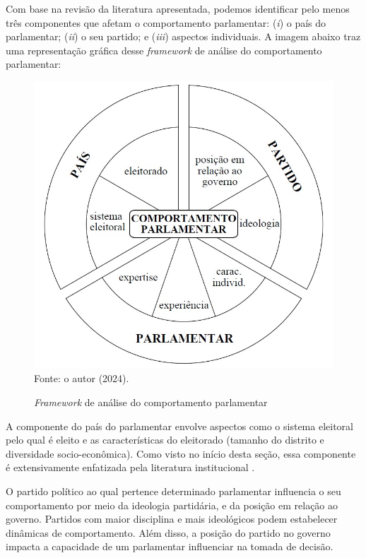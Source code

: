 Com base na revisão da literatura apresentada, podemos identificar pelo menos três componentes que afetam o comportamento parlamentar: (\textit{i}) o país do parlamentar; (\textit{ii}) o seu partido; e (\textit{iii}) aspectos individuais. A imagem abaixo traz uma representação gráfica desse \textit{framework} de análise do comportamento parlamentar:

    \begin{figure}[h]
        \caption{\textit{Framework} de análise do comportamento parlamentar}
        \includegraphics[width=\textwidth]{imgs/framework_compt_parlamentar.jpg}
        \label{fig:framework}
        \centering
        Fonte: o autor (2024).
    \end{figure}
    
    A componente do país do parlamentar envolve aspectos como o sistema eleitoral pelo qual é eleito e as características do eleitorado (tamanho do distrito e diversidade socio-econômica). Como visto no início desta seção, essa componente é extensivamente enfatizada pela literatura institucional \cite{mayhew2004congress}.
    
    O partido político ao qual pertence determinado parlamentar influencia o seu comportamento por meio da ideologia partidária, e da posição em relação ao governo. Partidos com maior disciplina e mais ideológicos podem estabelecer dinâmicas de comportamento. Além disso, a posição do partido no governo impacta a capacidade de um parlamentar influenciar na tomada de decisão.
    
